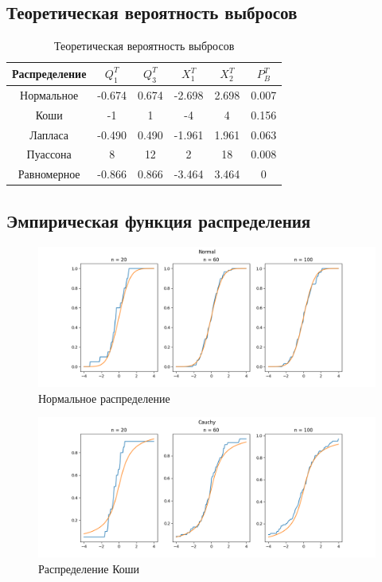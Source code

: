 \documentclass[12pt]{article}
\begin{document}
\subsection{Теоретическая вероятность выбросов}
\begin{table}[h!]
  \centering
  \begin{adjustbox}{width=0.5\textwidth}
    \begin{tabular}{| c | c | c | c | c | c |}
      \hline
      Распределение & $Q^T_1$ & $Q^T_3$ & $X^T_1$ & $X^T_2$ & $P^T_B$ \\\hline
      Нормальное & -0.674 & 0.674 & -2.698 & 2.698 & 0.007 \\\hline
      Коши & -1 & 1 & -4 & 4 & 0.156 \\\hline
      Лапласа & -0.490 & 0.490 & -1.961 & 1.961 & 0.063 \\\hline
      Пуассона & 8 & 12 & 2 & 18 & 0.008 \\\hline
      Равномерное & -0.866 & 0.866 & -3.464 & 3.464 & 0 \\\hline
      
    \end{tabular}
  \end{adjustbox}
  \caption{Теоретическая вероятность выбросов}
\end{table}

\FloatBarrier
\subsection{Эмпирическая функция распределения}

\begin{figure}[h!]
  \centering
  \includegraphics[width=0.8\paperwidth ]{../images/edf/Normal.png}
  \caption{Нормальное распределение}
\end{figure}

\begin{figure}[h!]
  \centering
  \includegraphics[width=0.8\paperwidth ]{../images/edf/Cauchy.png}
  \caption{Распределение Коши}
\end{figure}
\end{document}
